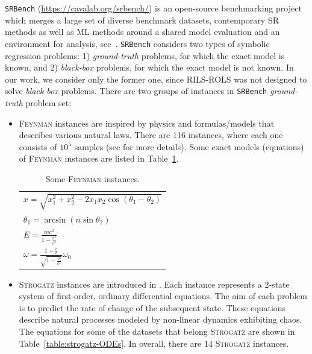 \documentclass{bmcart}
\begin{document}
\texttt{SRBench} (\url{https://cavalab.org/srbench/}) is an open-source benchmarking project which merges a large set of diverse benchmark datasets, contemporary SR methods as well as ML methods around a shared model evaluation and an environment for analysis, see~\cite{la2021contemporary}. \texttt{SRBench} considers two types of symbolic regression problems: 1) \emph{ground-truth} problems, for which the exact model is known, and 2) \emph{black-box} problems, for which the exact model is not known. In our work, we consider only the former one, since \textsc{RILS-ROLS} was not designed to solve \emph{black-box} problems. There are two groups of instances in \texttt{SRBench} \emph{ground-truth} problem set:
\begin{itemize}
	\item \textsc{Feynman} instances are inspired by physics and formulas/models that describes various natural laws.  
	There are 116 instances, where each one consists of $10^5$  samples (see \cite{udrescu2020ai} for more details). Some exact models (equations) of \textsc{Feynman} instances are listed in Table~\ref{tab:Feynamn-Eq}.  
	
	\begin{table}[!ht]
		\centering
		\begin{tabular}{l}   \hline
			$x = \sqrt{x_1^2 + x_2^2 - 2 x_1 x_2 \cos(\theta_1 - \theta_2)}$ \\
			$ \theta_1 = \arcsin(n \sin \theta_2)$ \\
			$E =  \frac{m c^2 }{1 - \frac{v^2}{c^2}}$ \\
			$\omega = \frac{1 + \frac{v}{c}}{ \sqrt{1 - \frac{v^2}{c^2}}} \omega_0$ \\ \hline
			
		\end{tabular}
		\caption{Some \textsc{Feynman} instances.}
		\label{tab:Feynamn-Eq}
	\end{table}
	
	
	\item \textsc{Strogatz} instances are introduced in \cite{la2016inference}. 
	Each instance represents a 2-state system of first-order, ordinary differential equations. 
	The aim of each problem is to predict the rate of change of the subsequent state. These equations describe natural processes modeled by non-linear dynamics exhibiting chaos.  The equations for some of the datasets that belong \textsc{Strogatz} are shown in Table~\ref{table:strogatz-ODEs}. In overall, there are 14 \textsc{Strogatz} instances. 
	

\end{itemize}
\end{document}
